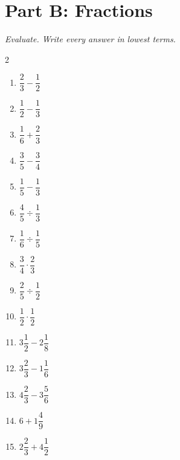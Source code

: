 \documentclass[11pt]{article}
\begin{document}
\section*{Part B: Fractions}
\noindent\textit{Evaluate. Write every answer in lowest terms.}
\begin{multicols}{2}
\begin{enumerate}
  \item $\dfrac{2}{3} - \dfrac{1}{2}$
  \vspace{1.4cm}
  \item $\dfrac{1}{2} - \dfrac{1}{3}$
  \vspace{1.4cm}
  \item $\dfrac{1}{6} + \dfrac{2}{3}$
  \vspace{1.4cm}
  \item $\dfrac{3}{5} - \dfrac{3}{4}$
  \vspace{1.4cm}
  \item $\dfrac{1}{5} - \dfrac{1}{3}$
  \vspace{1.4cm}
  \item $\dfrac{4}{5} \div \dfrac{1}{3}$
  \vspace{1.4cm}
  \item $\dfrac{1}{6} \div \dfrac{1}{5}$
  \vspace{1.4cm}
  \item $\dfrac{3}{4} \cdot \dfrac{2}{3}$
  \vspace{1.4cm}
  \item $\dfrac{2}{5} \div \dfrac{1}{2}$
  \vspace{1.4cm}
  \item $\dfrac{1}{2} \cdot \dfrac{1}{2}$
  \vspace{1.4cm}
  \item $3\dfrac{1}{2} - 2\dfrac{1}{8}$
  \vspace{1.4cm}
  \item $3\dfrac{2}{3} - 1\dfrac{1}{6}$
  \vspace{1.4cm}
  \item $4\dfrac{2}{3} - 3\dfrac{5}{6}$
  \vspace{1.4cm}
  \item $6 + 1\dfrac{4}{9}$
  \vspace{1.4cm}
  \item $2\dfrac{2}{3} + 4\dfrac{1}{2}$
  \vspace{1.4cm}
\end{enumerate}
\end{multicols}
\end{document}
